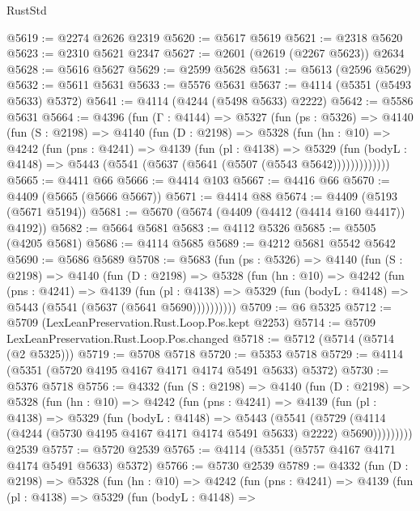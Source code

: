 \begin{lexlean}{RustStd}
\begin{coremodule}
@5619 := @2274 @2626 @2319
@5620 := @5617 @5619
@5621 := @2318 @5620
@5623 := @2310 @5621 @2347
@5627 := @2601 (@2619 (@2267 @5623)) @2634
@5628 := @5616 @5627
@5629 := @2599 @5628
@5631 := @5613 (@2596 @5629)
@5632 := @5611 @5631
@5633 := @5576 @5631
@5637 := @4114 (@5351 (@5493 @5633) @5372)
@5641 := @4114 (@4244 (@5498 @5633) @2222)
@5642 := @5586 @5631
@5664 := @4396
    (fun (Γ : @4144) =>
    @5327
      (fun (ps : @5326) =>
      @4140
        (fun (S : @2198) =>
        @4140
          (fun (D : @2198) =>
          @5328
            (fun (hn : @10) =>
            @4242
              (fun (pns : @4241) =>
              @4139
                (fun (pl : @4138) =>
                @5329
                  (fun (bodyL : @4148) =>
                  @5443 (@5541 (@5637 (@5641 (@5507 (@5543 @5642)))))))))))))
@5665 := @4411 @66
@5666 := @4414 @103
@5667 := @4416 @66
@5670 := @4409 (@5665 (@5666 @5667))
@5671 := @4414 @88
@5674 := @4409 (@5193 (@5671 @5194))
@5681 := @5670 (@5674 (@4409 (@4412 (@4414 @160 @4417)) @4192))
@5682 := @5664 @5681
@5683 := @4112 @5326
@5685 := @5505 (@4205 @5681)
@5686 := @4114 @5685
@5689 := @4212 @5681 @5542 @5642
@5690 := @5686 @5689
@5708 := @5683
    (fun (ps : @5326) =>
    @4140
      (fun (S : @2198) =>
      @4140
        (fun (D : @2198) =>
        @5328
          (fun (hn : @10) =>
          @4242
            (fun (pns : @4241) =>
            @4139
              (fun (pl : @4138) =>
              @5329 (fun (bodyL : @4148) => @5443 (@5541 (@5637 (@5641 @5690))))))))))
@5709 := @6 @5325
@5712 := @5709 (LexLeanPreservation.Rust.Loop.Pos.kept @2253)
@5714 := @5709 LexLeanPreservation.Rust.Loop.Pos.changed
@5718 := @5712 (@5714 (@5714 (@2 @5325)))
@5719 := @5708 @5718
@5720 := @5353 @5718
@5729 := @4114 (@5351 (@5720 @4195 @4167 @4171 @4174 @5491 @5633) @5372)
@5730 := @5376 @5718
@5756 := @4332
    (fun (S : @2198) =>
    @4140
      (fun (D : @2198) =>
      @5328
        (fun (hn : @10) =>
        @4242
          (fun (pns : @4241) =>
          @4139
            (fun (pl : @4138) =>
            @5329
              (fun (bodyL : @4148) =>
              @5443
                (@5541
                  (@5729
                    (@4114 (@4244 (@5730 @4195 @4167 @4171 @4174 @5491 @5633) @2222) @5690)))))))))
    @2539
@5757 := @5720 @2539
@5765 := @4114 (@5351 (@5757 @4167 @4171 @4174 @5491 @5633) @5372)
@5766 := @5730 @2539
@5789 := @4332
    (fun (D : @2198) =>
    @5328
      (fun (hn : @10) =>
      @4242
        (fun (pns : @4241) =>
        @4139
          (fun (pl : @4138) =>
          @5329
            (fun (bodyL : @4148) =>

\end{coremodule}
\end{lexlean}
